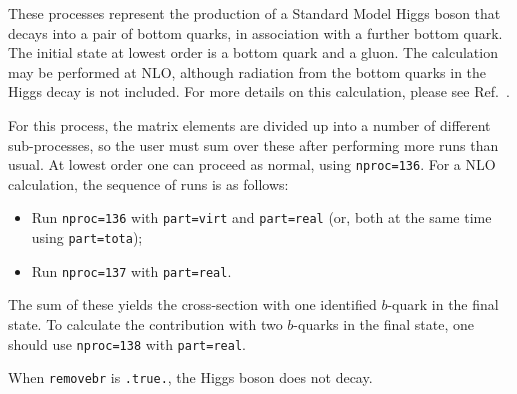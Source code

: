 \label{subsec:Hb}

These processes represent the production of a Standard Model Higgs
boson that decays into a pair of bottom quarks,
in association with a further bottom quark. The initial state at lowest order
is a bottom quark and a gluon.
The calculation may be performed at NLO, although radiation from the
bottom quarks in the Higgs decay is not included.
For more details on this calculation, please see Ref.~\cite{Campbell:2002zm}.

For this process, the matrix elements are divided up into a number of
different sub-processes, so the user must sum over these after performing
more runs than usual. At lowest order one can proceed as normal, using
{\tt nproc=136}. For a NLO calculation, the sequence of runs is as follows:
\begin{itemize}
\item Run {\tt nproc=136} with {\tt part=virt} and {\tt part=real} (or, both
at the same time using {\tt part=tota});
\item Run {\tt nproc=137} with {\tt part=real}.
\end{itemize}
The sum of these yields the cross-section with one identified $b$-quark in
the final state. To calculate the contribution with two $b$-quarks in the
final state, one should use {\tt nproc=138} with {\tt part=real}.

When {\tt removebr} is {\tt .true.}, the Higgs boson does not decay.
